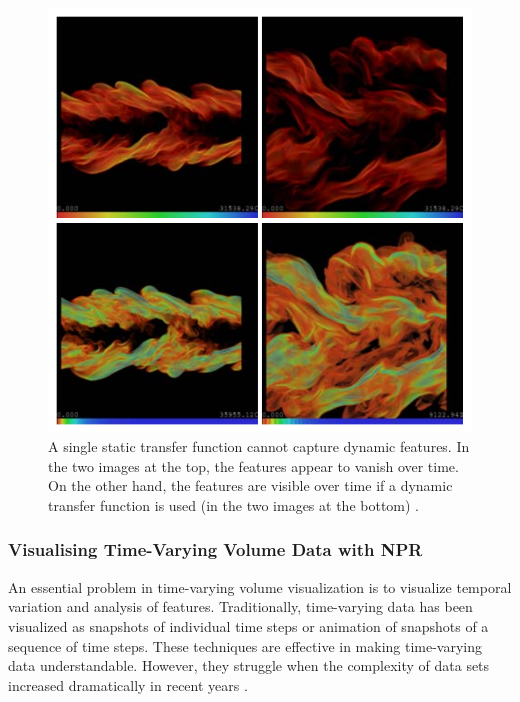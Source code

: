 \begin{figure}
\centering
\includegraphics[width=1\linewidth]{images/woodring_semi-automatic_2009}
\caption{A single static transfer function cannot capture dynamic features. In the two images at the top, the features appear to vanish over time. On the other hand, the features are visible over time if a dynamic transfer function is used (in the two images at the bottom) \cite{woodring_semi-automatic_2009}.}
\label{fig:woodring_semi-automatic_2009}
\end{figure}

\subsubsection{Visualising Time-Varying Volume Data with NPR}
An essential problem in time-varying volume visualization is to visualize temporal variation and analysis of features. Traditionally, time-varying data has been visualized as snapshots of individual time steps or animation of snapshots of a sequence of time steps. These techniques are effective in making time-varying data understandable. However, they struggle when the complexity of data sets increased dramatically in recent years \cite{brambilla_illustrative_2012}.

